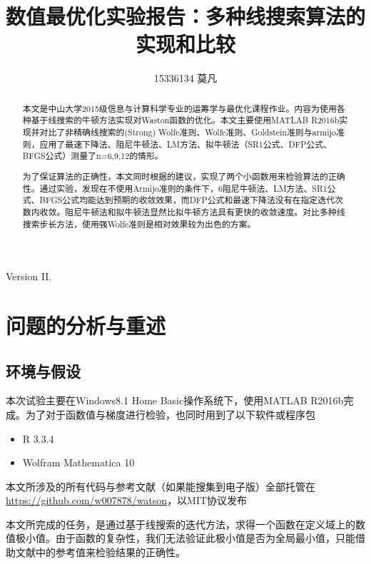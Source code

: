 \documentclass[11pt, a4paper]{article}
\begin{document}
\title{数值最优化实验报告：多种线搜索算法的实现和比较}
\author{15336134 莫凡}
\maketitle
\vspace{20pt}
\begin{center}
	\Large
	Version II.
\end{center}
\vspace{30pt}

\begin{abstract}
	本文是中山大学2015级信息与计算科学专业的运筹学与最优化课程作业\cite{高立2014数}。内容为使用各种基于线搜索的牛顿方法实现对Waston函数\cite{More:1981:TUO:355934.355936}的优化。本文主要使用MATLAB R2016b实现并对比了非精确线搜索的(Strong) Wolfe准则、Wolfe准则、Goldstein准则与armijo准则，应用了最速下降法、阻尼牛顿法、LM方法、拟牛顿法（SR1公式、DFP公式、BFGS公式）测量了n=6,9,12的情形。
	
	为了保证算法的正确性，本文同时根据\cite{More:1981:TUO:355934.355936}的建议，实现了两个小函数用来检验算法的正确性。通过实验，发现在不使用Armijo准则的条件下，6阻尼牛顿法、LM方法、SR1公式、BFGS公式均能达到预期的收敛效果，而DFP公式和最速下降法没有在指定迭代次数内收敛。阻尼牛顿法和拟牛顿法显然比拟牛顿方法具有更快的收敛速度。对比多种线搜索步长方法，使用强Wolfe准则是相对效果较为出色的方案。
\end{abstract}
\newpage
\tableofcontents
\newpage

\section{问题的分析与重述}

\subsection{环境与假设}
本次试验主要在Windows8.1 Home Basic操作系统下，使用MATLAB R2016b完成。为了对于函数值与梯度进行检验，也同时用到了以下软件或程序包
\begin{itemize}
	\item R 3.3.4
	\item Wolfram Mathematica 10
\end{itemize}

本文所涉及的所有代码与参考文献（如果能搜集到电子版）全部托管在 \url{https://github.com/w007878/watson}，以MIT协议发布

本文所完成的任务，是通过基于线搜索的迭代方法，求得一个函数在定义域上的数值极小值。由于函数的复杂性，我们无法验证此极小值是否为全局最小值，只能借助文献\cite{More:1981:TUO:355934.355936}中的参考值来检验结果的正确性。
\end{document}
